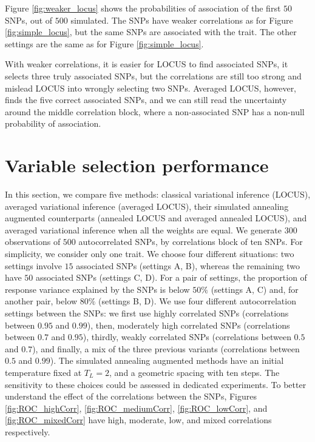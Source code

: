 \documentclass[a4paper, 11pt]{report}
\numberwithin{equation}{chapter}
\begin{document}
Figure \ref{fig:weaker_locus} shows the probabilities of association of the first $50$ SNPs, out of $500$ simulated. The SNPs have weaker correlations as for Figure \ref{fig:simple_locus}, but the same SNPs are associated with the trait. The other settings are the same as for Figure \ref{fig:simple_locus}.

With weaker correlations, it is easier for LOCUS to find associated SNPs, it selects three truly associated SNPs, but the correlations are still too strong and mislead LOCUS into wrongly selecting two SNPs. Averaged LOCUS, however, finds the five correct associated SNPs, and we can still read the uncertainty around the middle correlation block, where a non-associated SNP has a non-null probability of association.

\section{Variable selection performance} \label{sec:varSelPerf}

In this section, we compare five methods: classical variational inference (LOCUS), averaged variational inference (averaged LOCUS), their simulated annealing augmented counterparts (annealed LOCUS and averaged annealed LOCUS), and averaged variational inference when all the weights are equal. We generate $300$ observations of $500$ autocorrelated SNPs, by correlations block of ten SNPs. For simplicity, we consider only one trait. We choose four different situations: two settings involve $15$ associated SNPs (settings A, B), whereas the remaining two have $50$ associated SNPs (settings C, D). For a pair of settings, the proportion of response variance explained by the SNPs is below $50\%$ (settings A, C) and, for another pair, below $80\%$ (settings B, D). We use four different autocorrelation settings between the SNPs: we first use highly correlated SNPs (correlations between $0.95$ and $0.99$), then, moderately high correlated SNPs (correlations between $0.7$ and $0.95$), thirdly, weakly correlated SNPs (correlations between $0.5$ and $0.7$), and finally, a mix of the three previous variants (correlations between $0.5$ and $0.99$). The simulated annealing augmented methods have an initial temperature fixed at $T_L = 2$, and a geometric spacing with ten steps. The sensitivity to these choices could be assessed in dedicated experiments. To better understand the effect of the correlations between the SNPs, Figures \ref{fig:ROC_highCorr}, \ref{fig:ROC_mediumCorr}, \ref{fig:ROC_lowCorr},  and \ref{fig:ROC_mixedCorr} have high, moderate, low, and mixed correlations respectively.  
\end{document}

